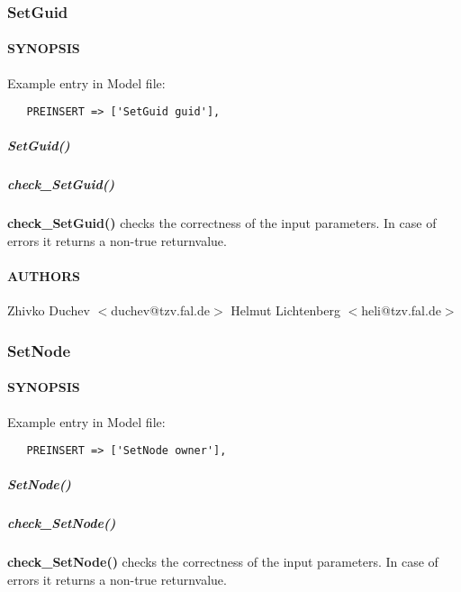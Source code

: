 \subsubsection{SetGuid\label{SetGuid}}




\paragraph*{SYNOPSIS\label{SetGuid_SYNOPSIS}}


Example entry in Model file:

\begin{verbatim}
   PREINSERT => ['SetGuid guid'],
\end{verbatim}
\subparagraph*{SetGuid()\label{SetGuid_SetGuid_}}
\subparagraph*{check\_SetGuid()\label{SetGuid_check_SetGuid_}}


\textbf{check\_SetGuid()} checks the correctness of the input parameters.
In case of errors it returns a non-true returnvalue.

\paragraph*{AUTHORS\label{SetGuid_AUTHORS}}


Zhivko Duchev $<$duchev@tzv.fal.de$>$
Helmut Lichtenberg $<$heli@tzv.fal.de$>$

\subsubsection{SetNode\label{SetNode}}




\paragraph*{SYNOPSIS\label{SetNode_SYNOPSIS}}


Example entry in Model file:

\begin{verbatim}
   PREINSERT => ['SetNode owner'],
\end{verbatim}
\subparagraph*{SetNode()\label{SetNode_SetNode_}}
\subparagraph*{check\_SetNode()\label{SetNode_check_SetNode_}}


\textbf{check\_SetNode()} checks the correctness of the input parameters.
In case of errors it returns a non-true returnvalue.

